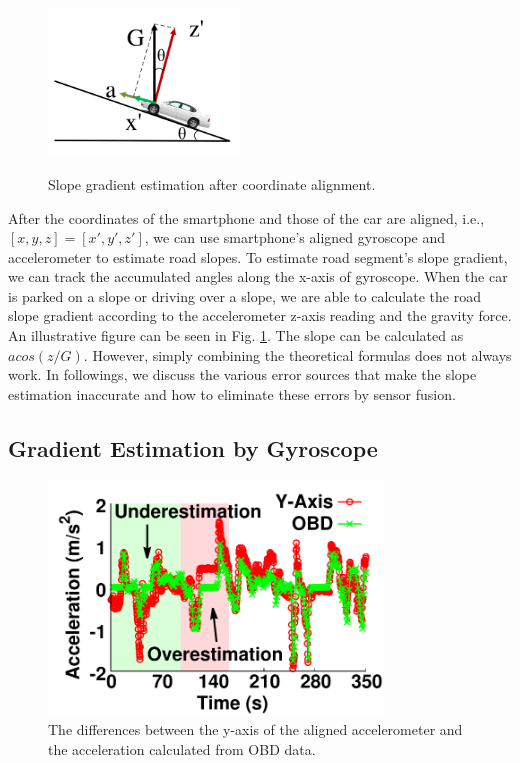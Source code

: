 
\begin{figure}[!tbp]
\begin{center}
\includegraphics[width=2.0in, angle=0]{Figs/SlopeAware/slopeandcar.pdf}
\vspace{-0.0cm}
\caption{Slope gradient estimation after coordinate alignment.}
\vspace{-0.3cm}
\label{slopecar}
\end{center}
\end{figure}

After the coordinates of the smartphone and
those of the car are aligned, i.e., $[x, y, z] = [x', y', z']$, 
we can use smartphone's aligned gyroscope and accelerometer to estimate road slopes.
To estimate road segment's slope gradient,
we can track the accumulated angles along the x-axis of gyroscope. 
When the car is parked on a slope or driving over a slope,
we are able to calculate the road slope gradient according to the 
accelerometer z-axis reading and the gravity force.
An illustrative figure can be seen in Fig. \ref{slopecar}.
The slope can be calculated as $acos(z/G)$.
However, simply combining the theoretical formulas does not always work.
In followings, we discuss the various error sources that make
the slope estimation inaccurate and how to eliminate these errors
by sensor fusion. 

\subsection{Gradient Estimation by Gyroscope}


\begin{figure}[!htbp]
\begin{center}
\includegraphics[width=3.5in,angle=0]{Figs/SlopeAware/accspeed.pdf}
\vspace{0.0cm}
\caption{The differences between the y-axis of the 
aligned accelerometer and the acceleration calculated from OBD data.}
\label{projectedaccelerometer}
\vspace{-0.2cm}
\end{center}
\end{figure}

